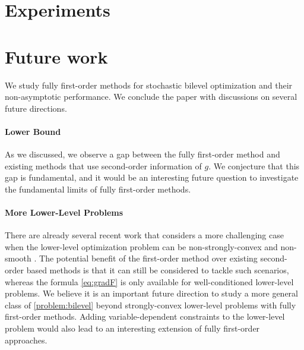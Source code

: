 \documentclass[11pt]{article}
\begin{document}
\section{Experiments}
\label{section:experiment}





\section{Future work}
We study fully first-order methods for stochastic bilevel optimization and their non-asymptotic performance. We conclude the paper with discussions on several future directions. 

\paragraph{Lower Bound} As we discussed, we observe a gap between the fully first-order method and existing methods that use second-order information of $g$. We conjecture that this gap is fundamental, and it would be an interesting future question to investigate the fundamental limits of fully first-order methods. 


\paragraph{More Lower-Level Problems} There are already several recent work that considers a more challenging case when the lower-level optimization problem can be non-strongly-convex \cite{liu2021towards, liu2021value, arbel2022non} and non-smooth \cite{lu2023first}. The potential benefit of the first-order method over existing second-order based methods is that it can still be considered to tackle such scenarios, whereas the formula \eqref{eq:gradF} is only available for well-conditioned lower-level problems. We believe it is an important future direction to study a more general class of \eqref{problem:bilevel} beyond strongly-convex lower-level problems with fully first-order methods. Adding variable-dependent constraints to the lower-level problem would also lead to an interesting extension of fully first-order approaches. 
 
\end{document}
